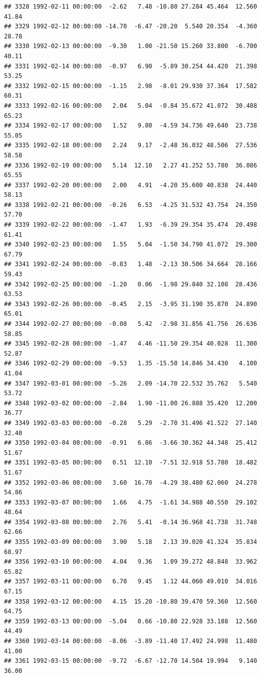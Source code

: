 \documentclass{article}\usepackage{graphicx, color}
\makeatletter
\newenvironment{kframe}{%
 \def\at@end@of@kframe{}%
 \ifinner\ifhmode%
  \def\at@end@of@kframe{\end{minipage}}%
  \begin{minipage}{\columnwidth}%
 \fi\fi%
 \def\FrameCommand##1{\hskip\@totalleftmargin \hskip-\fboxsep
 \colorbox{shadecolor}{##1}\hskip-\fboxsep
     \hskip-\linewidth \hskip-\@totalleftmargin \hskip\columnwidth}%
 \MakeFramed {\advance\hsize-\width
   \@totalleftmargin\z@ \linewidth\hsize
   \@setminipage}}%
 {\par\unskip\endMakeFramed%
 \at@end@of@kframe}
\newenvironment{knitrout}{}{} %
\makeatother
\begin{document}
\begin{knitrout}
\begin{kframe}
\begin{verbatim}
## 3328 1992-02-11 00:00:00  -2.62   7.48 -10.80 27.284 45.464  12.560  41.84
## 3329 1992-02-12 00:00:00 -14.70  -6.47 -20.20  5.540 20.354  -4.360  28.78
## 3330 1992-02-13 00:00:00  -9.30   1.00 -21.50 15.260 33.800  -6.700  40.11
## 3331 1992-02-14 00:00:00  -0.97   6.90  -5.89 30.254 44.420  21.398  53.25
## 3332 1992-02-15 00:00:00  -1.15   2.98  -8.01 29.930 37.364  17.582  60.31
## 3333 1992-02-16 00:00:00   2.04   5.04  -0.84 35.672 41.072  30.488  65.23
## 3334 1992-02-17 00:00:00   1.52   9.80  -4.59 34.736 49.640  23.738  55.05
## 3335 1992-02-18 00:00:00   2.24   9.17  -2.48 36.032 48.506  27.536  58.58
## 3336 1992-02-19 00:00:00   5.14  12.10   2.27 41.252 53.780  36.086  65.55
## 3337 1992-02-20 00:00:00   2.00   4.91  -4.20 35.600 40.838  24.440  58.13
## 3338 1992-02-21 00:00:00  -0.26   6.53  -4.25 31.532 43.754  24.350  57.70
## 3339 1992-02-22 00:00:00  -1.47   1.93  -6.39 29.354 35.474  20.498  61.41
## 3340 1992-02-23 00:00:00   1.55   5.04  -1.50 34.790 41.072  29.300  67.79
## 3341 1992-02-24 00:00:00  -0.83   1.48  -2.13 30.506 34.664  28.166  59.43
## 3342 1992-02-25 00:00:00  -1.20   0.06  -1.98 29.840 32.108  28.436  63.53
## 3343 1992-02-26 00:00:00  -0.45   2.15  -3.95 31.190 35.870  24.890  65.01
## 3344 1992-02-27 00:00:00  -0.08   5.42  -2.98 31.856 41.756  26.636  58.85
## 3345 1992-02-28 00:00:00  -1.47   4.46 -11.50 29.354 40.028  11.300  52.87
## 3346 1992-02-29 00:00:00  -9.53   1.35 -15.50 14.846 34.430   4.100  41.04
## 3347 1992-03-01 00:00:00  -5.26   2.09 -14.70 22.532 35.762   5.540  53.72
## 3348 1992-03-02 00:00:00  -2.84   1.90 -11.00 26.888 35.420  12.200  36.77
## 3349 1992-03-03 00:00:00  -0.28   5.29  -2.70 31.496 41.522  27.140  32.40
## 3350 1992-03-04 00:00:00  -0.91   6.86  -3.66 30.362 44.348  25.412  51.67
## 3351 1992-03-05 00:00:00   0.51  12.10  -7.51 32.918 53.780  18.482  51.67
## 3352 1992-03-06 00:00:00   3.60  16.70  -4.29 38.480 62.060  24.278  54.86
## 3353 1992-03-07 00:00:00   1.66   4.75  -1.61 34.988 40.550  29.102  48.64
## 3354 1992-03-08 00:00:00   2.76   5.41  -0.14 36.968 41.738  31.748  62.66
## 3355 1992-03-09 00:00:00   3.90   5.18   2.13 39.020 41.324  35.834  68.97
## 3356 1992-03-10 00:00:00   4.04   9.36   1.09 39.272 48.848  33.962  65.82
## 3357 1992-03-11 00:00:00   6.70   9.45   1.12 44.060 49.010  34.016  67.15
## 3358 1992-03-12 00:00:00   4.15  15.20 -10.80 39.470 59.360  12.560  64.75
## 3359 1992-03-13 00:00:00  -5.04   0.66 -10.80 22.928 33.188  12.560  44.49
## 3360 1992-03-14 00:00:00  -8.06  -3.89 -11.40 17.492 24.998  11.480  41.00
## 3361 1992-03-15 00:00:00  -9.72  -6.67 -12.70 14.504 19.994   9.140  36.00

\end{verbatim}
\end{kframe}
\end{knitrout}
\end{document}
